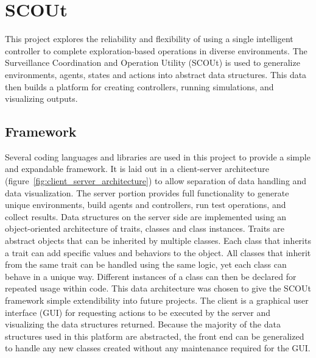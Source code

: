 

\lstset{
  language=Scala, %
  basicstyle=\ttfamily,
  numbers=left,
  numberstyle=\footnotesize,
  stepnumber=1,
  numbersep=2.0mm}



\chapter{SCOUt} \label{ch:scout}
This project explores the reliability and flexibility of using a single intelligent controller to complete exploration-based operations in diverse environments.
The Surveillance Coordination and Operation Utility (SCOUt) is used to generalize environments, agents, states and actions into abstract data structures.
This data then builds a platform for creating controllers, running simulations, and visualizing outputs.



\section{Framework} \label{sec:framework}
Several coding languages and libraries are used in this project to provide a simple and expandable framework.
It is laid out in a client-server architecture (figure~\ref{fig:client_server_architecture}) to allow separation of data handling and data visualization.
The server portion provides full functionality to generate unique environments, build agents and controllers, run test operations, and collect results.
Data structures on the server side are implemented using an object-oriented architecture of traits, classes and class instances.
Traits are abstract objects that can be inherited by multiple classes.
Each class that inherits a trait can add specific values and behaviors to the object.
All classes that inherit from the same trait can be handled using the same logic, yet each class can behave in a unique way.
Different instances of a class can then be declared for repeated usage within code.
This data architecture was chosen to give the SCOUt framework simple extendibility into future projects.
The client is a graphical user interface (GUI) for requesting actions to be executed by the server and visualizing the data structures returned.
Because the majority of the data structures used in this platform are abstracted, the front end can be generalized to handle any new classes created without any maintenance required for the GUI.

